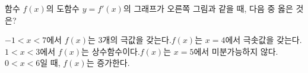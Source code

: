 \noindent\begin{minipage}[t]{0.58\linewidth}\vspace{0pt}\raggedright 함수 $f(x)$의 도함수 $y=f'(x)$의 그래프가 오른쪽 그림과 같을 때, 다음 중 옳은 것은?\end{minipage}\hfill\begin{minipage}[t]{0.4\linewidth}\vspace{0pt}\centering \resizebox{\ifdim\width>\linewidth\linewidth\else\width\fi}{!}{}\end{minipage}\par
\begin{choicesv}{$-1<x<7$에서 $f(x)$는 $3$개의 극값을 갖는다.}{$f(x)$는 $x=4$에서 극솟값을 갖는다.}{$1<x<3$에서 $f(x)$는 상수함수이다.}{$f(x)$는 $x=5$에서 미분가능하지 않다.}{$0<x<6$일 때, $f(x)$는 증가한다.}\end{choicesv}
